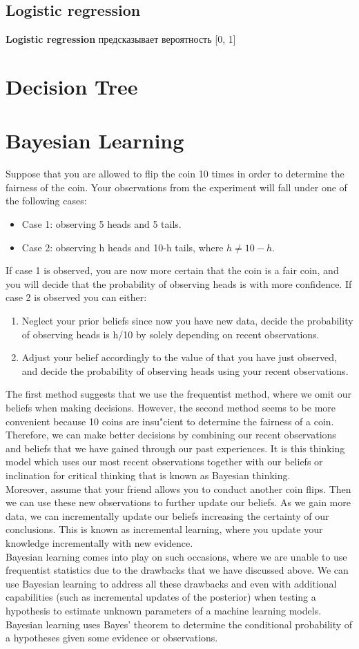 \documentclass{book}
\begin{document}
\section{Logistic regression}
\textbf{Logistic regression} предсказывает вероятность [0, 1]
\chapter{Decision Tree}
\chapter{Bayesian Learning}
Suppose that you are allowed to flip the coin 10 times in order to
determine the fairness of the coin. Your observations from the
experiment will fall under one of the following cases:
\begin{itemize}
\item Case 1: observing 5 heads and 5 tails.
\item Case 2: observing h heads and 10-h tails, where $h\neq 10-h$.
\end{itemize}
If case 1 is observed, you are now more certain that the coin is a fair
coin, and you will decide that the probability of observing heads is
with more confidence. If case 2 is observed you can either:
\begin{enumerate}
\item Neglect your prior beliefs since now you have new data, decide the
probability of observing heads is h/10 by solely depending on
recent observations.
\item Adjust your belief accordingly to the value of that you have just
observed, and decide the probability of observing heads using your
recent observations.
\end{enumerate}
The first method suggests that we use the frequentist method, where
we omit our beliefs when making decisions. However, the second
method seems to be more convenient because 10 coins are insu"cient
to determine the fairness of a coin. Therefore, we can make better
decisions by combining our recent observations and beliefs that we
have gained through our past experiences. It is this thinking model
which uses our most recent observations together with our beliefs or
inclination for critical thinking that is known as Bayesian thinking. \\
Moreover, assume that your friend allows you to conduct another
coin flips. Then we can use these new observations to further update
our beliefs. As we gain more data, we can incrementally update our
beliefs increasing the certainty of our conclusions. This is known as
incremental learning, where you update your knowledge
incrementally with new evidence.\\Bayesian learning comes into play on such occasions, where we are
unable to use frequentist statistics due to the drawbacks that we have
discussed above. We can use Bayesian learning to address all these
drawbacks and even with additional capabilities (such as incremental
updates of the posterior) when testing a hypothesis to estimate
unknown parameters of a machine learning models. Bayesian learning
uses Bayes’ theorem to determine the conditional probability of a
hypotheses given some evidence or observations.
\end{document}
